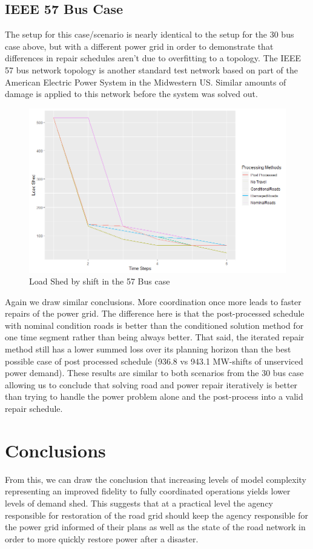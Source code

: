 \documentclass[10pt]{article}
\begin{document}
\subsection{IEEE 57 Bus Case}
The setup for this case/scenario is nearly identical to the setup for the 30 bus case above, but with a different power grid in order to demonstrate that differences in repair schedules aren't due to overfitting to a topology. The IEEE 57 bus network topology is another standard test network based on part of the American Electric Power System in the Midwestern US. Similar amounts of damage is applied to this network before the system was solved out.

\begin{figure}[H]
	\centering
	\caption{Load Shed by shift in the 57 Bus case}
	\includegraphics[width=.75\textwidth, height=0.5\textheight,keepaspectratio]{RPlot57.png}
	
\end{figure}

Again we draw similar conclusions. More coordination once more leads to faster repairs of the power grid. The difference here is that the post-processed schedule with nominal condition roads is better than the conditioned solution method for one time segment rather than being always better. That said, the iterated repair method still has a lower summed loss over its planning horizon than the best possible case of post processed schedule (936.8 vs 943.1 MW-shifts of unserviced power demand). These results are similar to both scenarios from the 30 bus case allowing us to conclude that solving road and power repair iteratively is better than trying to handle the power problem alone and the post-process into a valid repair schedule.
\section{\large{Conclusions}}
\label{sec:issues}
\vspace*{-12pt}

From this, we can draw the conclusion that increasing levels of model complexity representing an improved fidelity to fully coordinated operations yields lower levels of demand shed. This suggests that at a practical level the agency responsible for restoration of the road grid should keep the agency responsible for the power grid informed of their plans as well as the state of the road network in order to more quickly restore power after a disaster.


\end{document}
